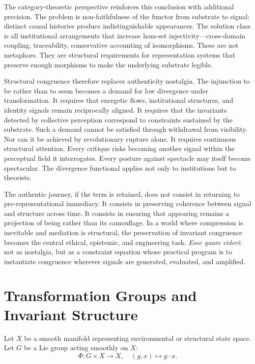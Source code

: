 \documentclass[11pt]{article}
\begin{document}
The category-theoretic perspective reinforces this conclusion with additional precision. The problem is non-faithfulness of the functor from substrate to signal: distinct causal histories produce indistinguishable appearances. The solution class is all institutional arrangements that increase hom-set injectivity---cross-domain coupling, traceability, conservative accounting of isomorphisms. These are not metaphors. They are structural requirements for representation systems that preserve enough morphisms to make the underlying substrate legible.

Structural congruence therefore replaces authenticity nostalgia. The injunction to be rather than to seem becomes a demand for low divergence under transformation. It requires that energetic flows, institutional structures, and identity signals remain reciprocally aligned. It requires that the invariants detected by collective perception correspond to constraints sustained by the substrate. Such a demand cannot be satisfied through withdrawal from visibility. Nor can it be achieved by revolutionary rupture alone. It requires continuous structural attention. Every critique risks becoming another signal within the perceptual field it interrogates. Every posture against spectacle may itself become spectacular. The divergence functional applies not only to institutions but to theorists.

The authentic journey, if the term is retained, does not consist in returning to pre-representational immediacy. It consists in preserving coherence between signal and structure across time. It consists in ensuring that appearing remains a projection of being rather than its camouflage. In a world where compression is inevitable and mediation is structural, the preservation of invariant congruence becomes the central ethical, epistemic, and engineering task. \textit{Esse quam videri}: not as nostalgia, but as a constraint equation whose practical program is to instantiate congruence wherever signals are generated, evaluated, and amplified.

\newpage
\appendix

\section{Transformation Groups and Invariant Structure}

Let $X$ be a smooth manifold representing environmental or structural state space. Let $G$ be a Lie group acting smoothly on $X$:
\[
\Phi : G \times X \to X, \quad (g,x) \mapsto g \cdot x.
\]
\end{document}
